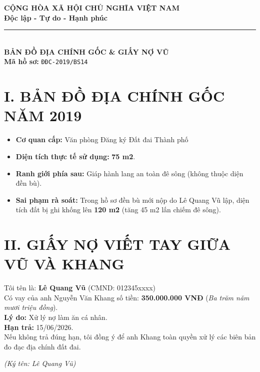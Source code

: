 \documentclass[12pt,a4paper]{article}
\begin{document}
\begin{center}
    \textbf{\Large CỘNG HÒA XÃ HỘI CHỦ NGHĨA VIỆT NAM}\\
    \textbf{\large Độc lập - Tự do - Hạnh phúc}\\
    \rule{8cm}{0.5pt}\\[0.5cm]
    
    \textbf{\LARGE BẢN ĐỒ ĐỊA CHÍNH GỐC \& GIẤY NỢ VŨ}\\
    \textbf{Mã hồ sơ:} \texttt{ĐĐC-2019/BS14}
\end{center}

\vspace{0.3cm}

\section*{I. BẢN ĐỒ ĐỊA CHÍNH GỐC NĂM 2019}
\begin{itemize}
    \item \textbf{Cơ quan cấp:} Văn phòng Đăng ký Đất đai Thành phố
    \item \textbf{Diện tích thực tế sử dụng:} \textbf{75 m2}.
    \item \textbf{Ranh giới phía sau:} Giáp hành lang an toàn đê sông (không thuộc diện đền bù).
    \item \textbf{Sai phạm rà soát:} Trong hồ sơ đền bù mới nộp do Lê Quang Vũ lập, diện tích đất bị ghi khống lên \textbf{120 m2} (tăng 45 m2 lấn chiếm đê sông).
\end{itemize}

\section*{II. GIẤY NỢ VIẾT TAY GIỮA VŨ VÀ KHANG}

\begin{tcolorbox}[colback=yellow!5!white,colframe=yellow!75!black,title=\textbf{GIẤY VAY TIỀN CÁ NHÂN}]
Tôi tên là: \textbf{Lê Quang Vũ} (CMND: 012345xxxx)\\
Có vay của anh Nguyễn Văn Khang số tiền: \textbf{350.000.000 VNĐ} (\textit{Ba trăm năm mươi triệu đồng}).\\
\textbf{Lý do:} Xử lý nợ làm ăn cá nhân.\\
\textbf{Hạn trả:} 15/06/2026.\\
Nếu không trả đúng hạn, tôi đồng ý để anh Khang toàn quyền xử lý các biên bản đo đạc địa chính đất đai.\\
\begin{flushright}
    \textit{(Ký tên: Lê Quang Vũ)}
\end{flushright}
\end{tcolorbox}
\end{document}
